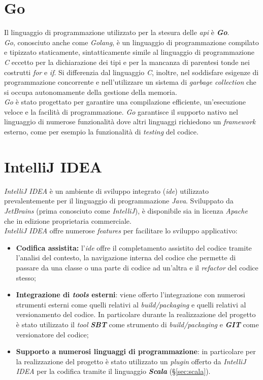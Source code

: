 \section{Go}\label{sec:go}
Il linguaggio di programmazione utilizzato per la stesura delle \textit{\gls{api}} è \textbf{\textit{Go}}.\\
\textit{Go}, conosciuto anche come \textit{Golang}, è un linguaggio di programmazione compilato e tipizzato staticamente, sintatticamente simile al linguaggio di programmazione \textit{C} eccetto per la dichiarazione dei tipi e per la mancanza di parentesi tonde nei costrutti \textit{for} e \textit{if}. Si differenzia dal linguaggio \textit{C}, inoltre, nel soddisfare esigenze di programmazione concorrente e nell'utilizzare un sistema di \textit{garbage collection} che si occupa autonomamente della gestione della memoria.\\
\textit{Go} è stato progettato per garantire una compilazione efficiente, un'esecuzione veloce e la facilità di programmazione.
\textit{Go} garantisce il supporto nativo nel linguaggio di numerose funzionalità dove altri linguaggi richiedono un \textit{\textit{\gls{framework}}} esterno, come per esempio la funzionalità di \textit{testing} del codice.

\section{IntelliJ IDEA}
\textit{IntelliJ IDEA} è un ambiente di sviluppo integrato (\textit{\gls{ide}}) utilizzato prevalentemente per il linguaggio di programmazione \textit{Java}. Sviluppato da \textit{JetBrains} (prima conosciuto come \textit{IntelliJ}), è disponibile sia in licenza \textit{Apache} che in edizione proprietaria commerciale.\\
\textit{IntelliJ IDEA} offre numerose \textit{features} per facilitare lo sviluppo applicativo:
\begin{itemize}
	\item{\textbf{Codifica assistita:} l'\textit{\gls{ide}} offre il completamento assistito del codice tramite l'analisi del contesto, la navigazione interna del codice che permette di passare da una classe o una parte di codice ad un'altra e il \textit{refactor} del codice stesso;}
	\item{\textbf{Integrazione di \textit{tools} esterni}: viene offerto l'integrazione con numerosi strumenti esterni come quelli relativi al \textit{build/packaging} e quelli relativi al versionamento del codice. In particolare durante la realizzazione del progetto è stato utilizzato il \textit{tool} \textbf{\textit{SBT}} come strumento di \textit{build/packaging} e \textbf{\textit{GIT}} come versionatore del codice;}
	\item{\textbf{Supporto a numerosi linguaggi di programmazione}: in particolare per la realizzazione del progetto è stato utilizzato un \textit{plugin} offerto da \textit{IntelliJ IDEA} per la codifica tramite il linguaggio \textbf{\textit{Scala}} (\S\ref{sec:scala}).}
\end{itemize}

